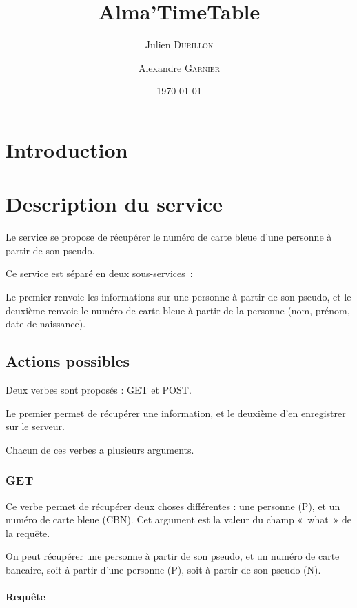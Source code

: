 \documentclass[a4paper,11pt,french]{article}
\title{Alma'TimeTable}
\author{Julien \textsc{Durillon} \and Alexandre \textsc{Garnier}}
\date{\today}
\begin{document}
	\maketitle
	
	\section*{Introduction}
	
	\section{Description du service}
	
	   Le service se propose de récupérer le numéro de carte bleue d'une personne
	   à partir de son pseudo.
	   
	   Ce service est séparé en deux sous-services~:
	   
	   Le premier renvoie les informations sur une personne à partir de son
	   pseudo, et le deuxième renvoie le numéro de carte bleue à partir de la
	   personne (nom, prénom, date de naissance).
	   
	   
	   \subsection{Actions possibles}
	   
	      Deux verbes sont proposés : GET et POST.
	      
	      Le premier permet de récupérer une information, et le deuxième d'en
	      enregistrer sur le serveur.
	      
	      Chacun de ces verbes a plusieurs arguments.
	      
	      \subsubsection{GET}
	      
            Ce verbe permet de récupérer deux choses différentes : une personne
            (P), et un numéro de carte bleue (CBN). Cet argument est la valeur
            du champ «~what~» de la requête.

            On peut récupérer une personne à partir de son pseudo, et un numéro
            de carte bancaire, soit à partir d'une personne (P), soit à partir de
            son pseudo (N).
            
            \paragraph{Requête}
            
\end{document}
